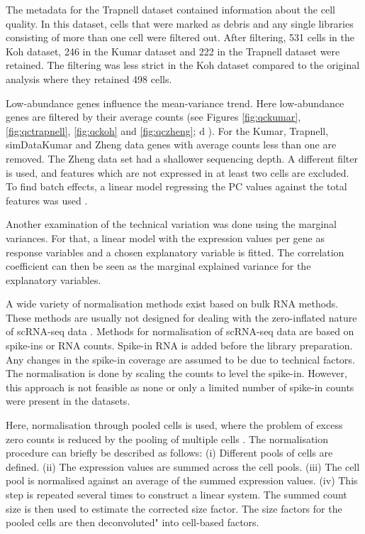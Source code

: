 \documentclass[12pt, a4paper]{article}\usepackage[]{graphicx}\usepackage[]{color}
\begin{document}
The metadata for the Trapnell dataset contained information about the cell quality. In this dataset, cells that were marked as debris and any single libraries consisting of more than one cell were filtered out. After filtering, 531 cells in the Koh dataset, 246 in the Kumar dataset and 222 in the Trapnell dataset were retained. The filtering was less strict in the Koh dataset compared to the original analysis where they retained 498 cells. 

Low-abundance genes influence the mean-variance trend. Here low-abundance genes are filtered by their average counts (see Figures \ref{fig:qckumar}, \ref{fig:qctrapnell}, \ref{fig:qckoh} and \ref{fig:qczheng}; d ). For the Kumar, Trapnell, simDataKumar and Zheng data genes with average counts less than one are removed. The Zheng data set had a shallower sequencing depth. A different filter is used, and features which are not expressed in at least two cells are excluded.
To find batch effects, a linear model regressing the PC values against the total features was used \citep{lun2016step}. 

Another examination of the technical variation was done using the marginal variances\citep{lun2016step}. For that, a linear model with the expression values per gene as response variables and a chosen explanatory variable is fitted. The correlation coefficient can then be seen as the marginal explained variance for the explanatory variables.

A wide variety of normalisation methods exist based on bulk RNA methods. These methods are usually not designed for dealing with the zero-inflated nature of scRNA-seq data \citep{lun2016pooling}. 
Methods for normalisation of scRNA-seq data are based on spike-ins or RNA counts. Spike-in RNA is added before the library preparation. Any changes in the spike-in coverage are assumed to be due to technical factors. The normalisation is done by scaling the counts to level the spike-in. However, this approach is not feasible as none or only a limited number of spike-in counts were present in the datasets.

Here, normalisation through pooled cells is used, where the problem of excess zero counts is reduced by the pooling of multiple cells \citep{lun2016pooling}. The normalisation procedure can briefly be described as follows: (i) Different pools of cells are defined. (ii) The expression values are summed across the cell pools. (iii) The cell pool is normalised against an average of the summed expression values. (iv) This step is repeated several times to construct a linear system. 
The summed count size is then used to estimate the corrected size factor. The size factors for the pooled cells are then deconvoluted" into cell-based factors. 
\end{document}
